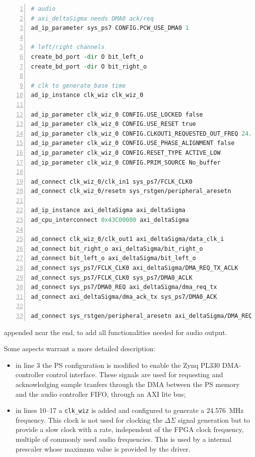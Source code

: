 \documentclass[12pt,oneside]{article}
\begin{document}
\begin{lstlisting}[language=TCL, numbers=left]
# audio
# axi_deltaSigma needs DMA0 ack/req
ad_ip_parameter sys_ps7 CONFIG.PCW_USE_DMA0 1

# left/right channels
create_bd_port -dir O bit_left_o
create_bd_port -dir O bit_right_o

# clk to generate base time
ad_ip_instance clk_wiz clk_wiz_0

ad_ip_parameter clk_wiz_0 CONFIG.USE_LOCKED false
ad_ip_parameter clk_wiz_0 CONFIG.USE_RESET true
ad_ip_parameter clk_wiz_0 CONFIG.CLKOUT1_REQUESTED_OUT_FREQ 24.576
ad_ip_parameter clk_wiz_0 CONFIG.USE_PHASE_ALIGNMENT false
ad_ip_parameter clk_wiz_0 CONFIG.RESET_TYPE ACTIVE_LOW
ad_ip_parameter clk_wiz_0 CONFIG.PRIM_SOURCE No_buffer

ad_connect clk_wiz_0/clk_in1 sys_ps7/FCLK_CLK0
ad_connect clk_wiz_0/resetn sys_rstgen/peripheral_aresetn

ad_ip_instance axi_deltaSigma axi_deltaSigma
ad_cpu_interconnect 0x43C00000 axi_deltaSigma

ad_connect clk_wiz_0/clk_out1 axi_deltaSigma/data_clk_i
ad_connect bit_right_o axi_deltaSigma/bit_right_o
ad_connect bit_left_o axi_deltaSigma/bit_left_o
ad_connect sys_ps7/FCLK_CLK0 axi_deltaSigma/DMA_REQ_TX_ACLK
ad_connect sys_ps7/FCLK_CLK0 sys_ps7/DMA0_ACLK
ad_connect sys_ps7/DMA0_REQ axi_deltaSigma/dma_req_tx
ad_connect axi_deltaSigma/dma_ack_tx sys_ps7/DMA0_ACK

ad_connect sys_rstgen/peripheral_aresetn axi_deltaSigma/DMA_REQ_TX_RSTN
\end{lstlisting}
appended near the end, to add all functionalities needed for audio output.

Some aspects warrant a more detailed description:
\begin{itemize}
\item in line 3 the PS configuration is modified to enable the Zynq PL330 DMA-controller
control interface. These signals are used for requesting and acknowledging sample 
tranfers through the DMA between the PS memory and the audio controller FIFO, through an
AXI lite bus;
\item in lines 10--17 a {\tt clk\_wiz} is added and configured to generate a
24.576~MHz frequency. This clock is not used for clocking the $\Delta\Sigma$ signal generation 
but to provide a slow clock with a rate, independent of the FPGA clock frequency, multiple of 
commonly used audio frequencies. This is used by a internal prescaler whose maximum value is 
provided by
the driver.
\end{itemize}
\end{document}

